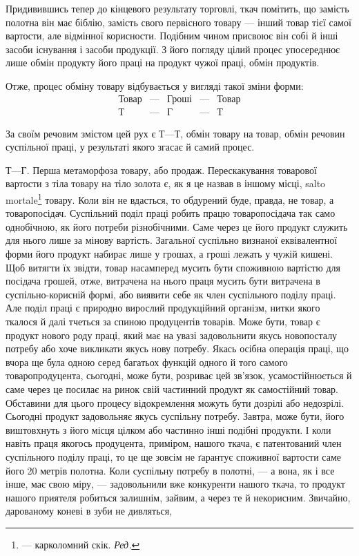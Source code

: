 Придивившись тепер до кінцевого результату торговлі, ткач
помітить, що замість полотна він має біблію, замість свого первісного
товару — інший товар тієї самої вартости, але відмінної
корисности. Подібним чином присвоює він собі й інші засоби
існування і засоби продукції. З його погляду цілий процес
упосереднює лише обмін продукту його праці на продукт чужої
праці, обмін продуктів.

Отже, процес обміну товару відбувається у вигляді такої зміни
форми:
\[
 \begin{matrix}
  \text{Товар} &—& \text{Гроші} &—& \text{Товар} \\
  Т &—& Г &—& Т
 \end{matrix}
\]

За своїм речовим змістом цей рух є $Т — Т$, обмін товару на
товар, обмін речовин суспільної праці, у результаті якого згасає
й самий процес.

$Т — Г$. Перша метаморфоза товару, або продаж. Перескакування
товарової вартости з тіла товару на тіло золота є, як я
це назвав в іншому місці, salto mortale\footnote*{
— карколомний скік. \emph{Ред.}
} товару. Коли він не
вдасться, то обдурений буде, правда, не товар, а товаропосідач.
Суспільний поділ праці робить працю товаропосідача так само
однобічною, як його потреби різнобічними. Саме через це його
продукт служить для нього лише за мінову вартість. Загальної
суспільно визнаної еквівалентної форми його продукт набирає
лише у грошах, а гроші лежать у чужій кишені. Щоб витягти
їх звідти, товар насамперед мусить бути споживною вартістю
для посідача грошей, отже, витрачена на нього праця мусить
бути витрачена в суспільно-корисній формі, або виявити себе
як член суспільного поділу праці. Але поділ праці є природно
вирослий продукційний організм, нитки якого ткалося й далі
тчеться за спиною продуцентів товарів. Може бути, товар є продукт
нового роду праці, який має на увазі задовольнити якусь
новопосталу потребу або хоче викликати якусь нову потребу.
Якась осібна операція праці, що вчора ще була одною серед
багатьох функцій одного й того самого товаропродуцента, сьогодні,
може бути, розриває цей зв’язок, усамостійнюється й
саме через це посилає на ринок свій частинний продукт як самостійний
товар. Обставини для цього процесу відокремлення можуть
бути дозрілі або недозрілі. Сьогодні продукт задовольняє
якусь суспільну потребу. Завтра, може бути, його виштовхнуть
з його місця цілком або частинно інші подібні продукти. І коли
навіть праця якогось продуцента, приміром, нашого ткача, є
патентований член суспільного поділу праці, то це ще зовсім
не ґарантує споживної вартости саме його 20 метрів полотна.
Коли суспільну потребу в полотні, — а вона, як і все інше, має
свою міру, — задовольнили вже конкуренти нашого ткача, то
продукт нашого приятеля робиться залишнім, зайвим, а через
те й некорисним. Звичайно, дарованому коневі в зуби не дивляться,
\parbreak{}  %
